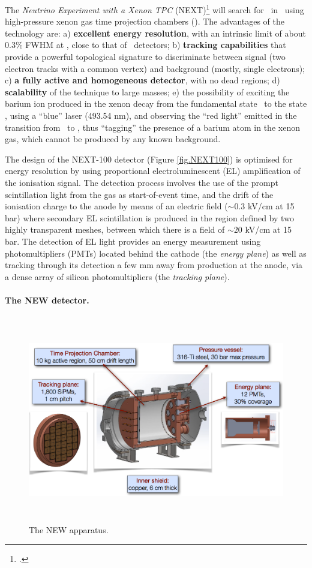 The \emph{Neutrino Experiment with a Xenon TPC} (NEXT)\footcite{next} will search for \bbonu\ in \XE\ using  high-pressure xenon gas  time projection chambers (\HPXE). The advantages of the technology are: 
a) {\bf excellent energy resolution}, with an intrinsic limit of about 0.3\% FWHM at \Qbb, close to that of \GE\ detectors; b)
{\bf tracking capabilities} that provide a powerful topological signature to discriminate between signal (two electron tracks with a common vertex) and background (mostly, single electrons); c)
{\bf a fully active and homogeneous detector}, with no dead regions; d) {\bf scalability} of the technique to large masses; e) the possibility of exciting the barium ion produced in the xenon decay from the fundamental state \TwoS\ to the state \TwoP, using a ``blue'' laser (493.54 nm), and observing the ``red light'' emitted in the transition from \TwoP\ to \TwoD, thus ``tagging'' the presence of a barium atom in the xenon gas, which cannot be produced by any known background. 

The design of the NEXT-100 detector (Figure \ref{fig.NEXT100}) is optimised for energy resolution by using proportional electroluminescent (EL) amplification of the ionisation signal. The detection process involves the use of the prompt scintillation light from the gas as start-of-event time, and the drift of the ionisation charge to the anode by means of an electric field ($\sim0.3$ kV/cm at 15 bar) where secondary EL scintillation is produced in the region defined by two highly transparent meshes, between which there is a field of $\sim20$ kV/cm at 15 bar. The detection of EL light provides an energy measurement using photomultipliers (PMTs) located behind the cathode (the \emph{energy plane}) as well as tracking through its detection a few mm away from production at the anode, via a dense array of silicon photomultipliers (the \emph{tracking plane}).

\paragraph{\label{sec.new}The NEW detector.}

\begin{figure}
\centering
\includegraphics[height=9cm]{img/NEW.png}
\caption{\small The NEW apparatus.} \label{fig:NEW}
\end{figure} 

